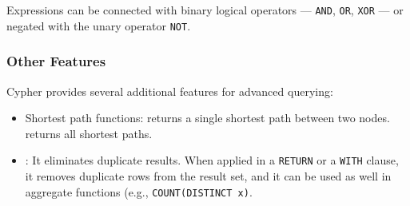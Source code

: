 Expressions can be connected with binary logical operators --- \texttt{AND}, \texttt{OR}, \texttt{XOR} --- or negated with the unary operator \texttt{NOT}.

\subsubsection{Other Features}

Cypher provides several additional features for advanced querying:

\begin{itemize}
    \item Shortest path functions:  returns a single shortest path between two nodes.  returns all shortest paths.
    \item {}: It eliminates duplicate results. When applied in a \texttt{RETURN} or a \texttt{WITH} clause, it removes duplicate rows from the result set, and it can be used as well in aggregate functions (e.g., \texttt{COUNT(DISTINCT x)}.
\end{itemize}

